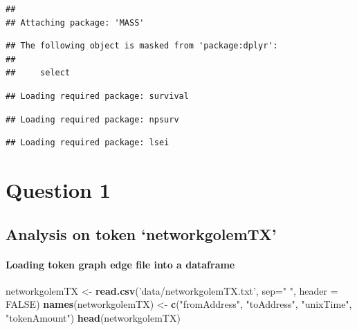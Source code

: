 \documentclass[]{article}
\newenvironment{Shaded}{\begin{snugshade}}{\end{snugshade}}
\newcommand{\KeywordTok}[1]{\textcolor[rgb]{0.13,0.29,0.53}{\textbf{#1}}}
\newcommand{\DataTypeTok}[1]{\textcolor[rgb]{0.13,0.29,0.53}{#1}}
\newcommand{\StringTok}[1]{\textcolor[rgb]{0.31,0.60,0.02}{#1}}
\newcommand{\OtherTok}[1]{\textcolor[rgb]{0.56,0.35,0.01}{#1}}
\newcommand{\NormalTok}[1]{#1}
\let\oldparagraph\paragraph
\renewcommand{\paragraph}[1]{\oldparagraph{#1}\mbox{}}
\begin{document}
\begin{verbatim}
## 
## Attaching package: 'MASS'
\end{verbatim}

\begin{verbatim}
## The following object is masked from 'package:dplyr':
## 
##     select
\end{verbatim}

\begin{verbatim}
## Loading required package: survival
\end{verbatim}

\begin{verbatim}
## Loading required package: npsurv
\end{verbatim}

\begin{verbatim}
## Loading required package: lsei
\end{verbatim}

\section{Question 1}\label{question-1}

\subsection{\texorpdfstring{Analysis on token
`networkgolemTX'}{Analysis on token networkgolemTX}}\label{analysis-on-token-networkgolemtx}

\paragraph{Loading token graph edge file into a
dataframe}\label{loading-token-graph-edge-file-into-a-dataframe}

\begin{Shaded}
\begin{Highlighting}[]
\NormalTok{networkgolemTX <-}\StringTok{ }\KeywordTok{read.csv}\NormalTok{(}\StringTok{'data/networkgolemTX.txt'}\NormalTok{, }\DataTypeTok{sep=}\StringTok{" "}\NormalTok{, }\DataTypeTok{header =} \OtherTok{FALSE}\NormalTok{)}
\KeywordTok{names}\NormalTok{(networkgolemTX) <-}\StringTok{ }\KeywordTok{c}\NormalTok{(}\StringTok{"fromAddress"}\NormalTok{, }\StringTok{"toAddress"}\NormalTok{, }\StringTok{"unixTime"}\NormalTok{, }\StringTok{"tokenAmount"}\NormalTok{)}
\KeywordTok{head}\NormalTok{(networkgolemTX)}
\end{Highlighting}
\end{Shaded}
\end{document}

